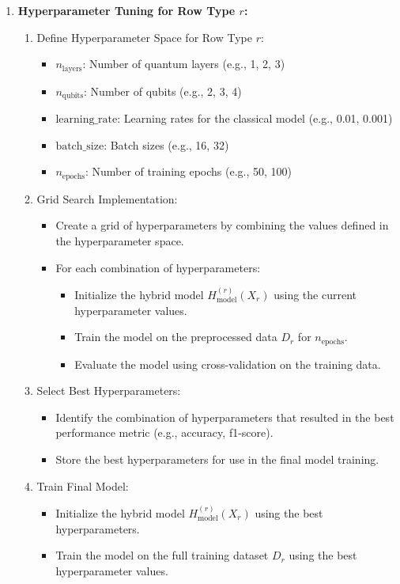 \documentclass[a4paper]{article}
\begin{document}
\begin{enumerate}[label=\arabic*.]
\item \textbf{Hyperparameter Tuning for Row Type \( r \):}
\hspace*{2em} \begin{enumerate}[label=\arabic*.]
	\item[] Define Hyperparameter Space for Row Type \( r \):
	\begin{itemize}
		\item[] \( n_{\text{layers}} \): Number of quantum layers (e.g., 1, 2, 3)
		\item[] \( n_{\text{qubits}} \): Number of qubits (e.g., 2, 3, 4)
		\item[] \( \text{learning\_rate} \): Learning rates for the classical model (e.g., 0.01, 0.001)
		\item[] \( \text{batch\_size} \): Batch sizes (e.g., 16, 32)
		\item[] \( n_{\text{epochs}} \): Number of training epochs (e.g., 50, 100)
	\end{itemize}	
	\item[] Grid Search Implementation:
	\begin{itemize}
		\item[] Create a grid of hyperparameters by combining the values defined in the hyperparameter space.
		\item[] For each combination of hyperparameters:
		\begin{itemize}
			\item[] Initialize the hybrid model \( H^{(r)}_{\text{model}}(X_r) \) using the current hyperparameter values.
			\item[] Train the model on the preprocessed data \( D_r \) for \( n_{\text{epochs}} \).
			\item[] Evaluate the model using cross-validation on the training data.
		\end{itemize}
	\end{itemize}	
	\item[] Select Best Hyperparameters:
	\begin{itemize}
		\item[] Identify the combination of hyperparameters that resulted in the best performance metric (e.g., accuracy, \gls{f1}-score).
		\item[] Store the best hyperparameters for use in the final model training.
	\end{itemize}

	\item[] Train Final Model:
	\begin{itemize}
		\item[] Initialize the hybrid model \( H^{(r)}_{\text{model}}(X_r) \) using the best hyperparameters.
		\item[] Train the model on the full training dataset \( D_r \) using the best hyperparameter values.
	\end{itemize}	
	\end{enumerate}	
	

\end{enumerate}
\end{document}
